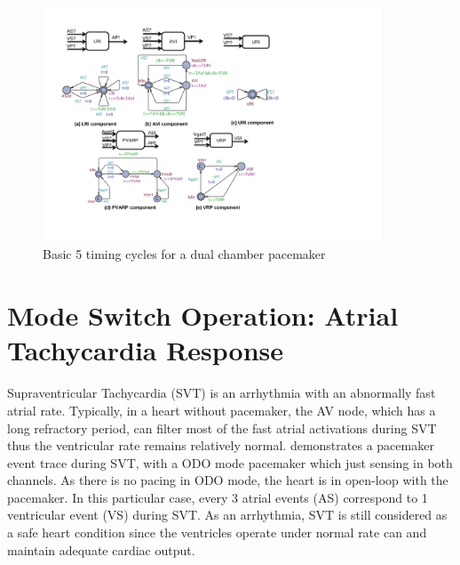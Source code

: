 \begin{figure}[!t]
\center
\includegraphics[width=0.9\textwidth]{figs/pacemaker.pdf}
\caption{Basic 5 timing cycles for a dual chamber pacemaker}
\label{fig:PMdesign}
\end{figure} 

\section{Mode Switch Operation: Atrial Tachycardia Response}
Supraventricular Tachycardia (SVT) is an arrhythmia with an abnormally fast atrial rate. %
Typically, in a heart without pacemaker, the AV node, which has a long refractory period, can filter most of the fast atrial activations during SVT thus the ventricular rate remains relatively normal.  demonstrates a pacemaker event trace during SVT, with a ODO mode pacemaker which just sensing in both channels. 
As there is no pacing in ODO mode, the heart is in open-loop with the pacemaker. In this particular case, every 3 atrial events (AS) correspond to 1 ventricular event (VS) during SVT. 
As an arrhythmia, SVT is still considered as a safe heart condition since the ventricles operate under normal rate can and maintain adequate cardiac output. 

